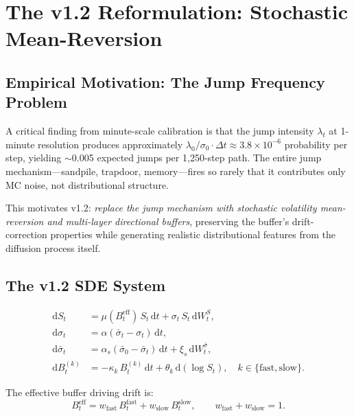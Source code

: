 \documentclass[11pt,a4paper]{article}
\newcommand{\diff}{\mathrm{d}}
\newcommand{\dt}{\diff t}
\begin{document}
\section{The v1.2 Reformulation: Stochastic Mean-Reversion}
\label{sec:v12}

\subsection{Empirical Motivation: The Jump Frequency Problem}

A critical finding from minute-scale calibration is that the jump intensity
$\lambda_t$ at 1-minute resolution produces approximately
$\lambda_0 / \sigma_0 \cdot \Delta t \approx 3.8 \times 10^{-6}$ probability
per step, yielding $\sim$0.005 expected jumps per 1{,}250-step path. The
entire jump mechanism---sandpile, trapdoor, memory---fires so rarely that
it contributes only MC noise, not distributional structure.

This motivates v1.2: \emph{replace the jump mechanism with stochastic
volatility mean-reversion and multi-layer directional buffers}, preserving
the buffer's drift-correction properties while generating realistic
distributional features from the diffusion process itself.

\subsection{The v1.2 SDE System}

\begin{align}
  \diff S_t &= \mu(B_t^{\text{eff}})\, S_t \,\dt + \sigma_t\, S_t \,\diff W_t^S,
    \label{eq:v12_price} \\[4pt]
  \diff \sigma_t &= \alpha(\bar{\sigma}_t - \sigma_t)\,\dt,
    \label{eq:v12_vol} \\[4pt]
  \diff \bar{\sigma}_t &= \alpha_s(\bar{\sigma}_0 - \bar{\sigma}_t)\,\dt
    + \xi_s\,\diff W_t^{\bar{\sigma}},
    \label{eq:v12_voltarget} \\[4pt]
  \diff B_t^{(k)} &= -\kappa_k\, B_t^{(k)}\,\dt + \theta_k\,\diff(\log S_t),
    \quad k \in \{\text{fast}, \text{slow}\}.
    \label{eq:v12_buffers}
\end{align}

The effective buffer driving drift is:
\begin{equation}
  B_t^{\text{eff}} = w_{\text{fast}}\, B_t^{\text{fast}} + w_{\text{slow}}\, B_t^{\text{slow}},
  \qquad w_{\text{fast}} + w_{\text{slow}} = 1.
\end{equation}
\end{document}

